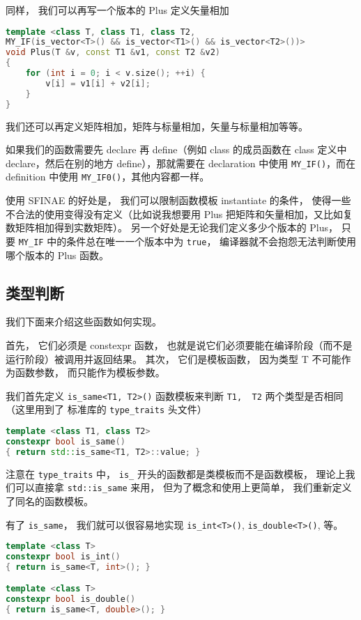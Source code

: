 同样， 我们可以再写一个版本的 Plus 定义矢量相加
\begin{lstlisting}[language=cpp]
template <class T, class T1, class T2,
MY_IF(is_vector<T>() && is_vector<T1>() && is_vector<T2>())>
void Plus(T &v, const T1 &v1, const T2 &v2)
{
    for (int i = 0; i < v.size(); ++i) {
        v[i] = v1[i] + v2[i];
    }
}
\end{lstlisting}

我们还可以再定义矩阵相加，矩阵与标量相加，矢量与标量相加等等。

如果我们的函数需要先 declare 再 define（例如 class 的成员函数在 class 定义中 declare，然后在别的地方 define），那就需要在 declaration 中使用 \verb|MY_IF()|，而在 definition 中使用 \verb|MY_IF0()|，其他内容都一样。

使用 SFINAE 的好处是， 我们可以限制函数模板 instantiate 的条件， 使得一些不合法的使用变得没有定义（比如说我想要用 Plus 把矩阵和矢量相加，又比如复数矩阵相加得到实数矩阵）。 另一个好处是无论我们定义多少个版本的 Plus， 只要 \verb|MY_IF| 中的条件总在唯一一个版本中为 \verb|true|， 编译器就不会抱怨无法判断使用哪个版本的 Plus 函数。

\subsection{类型判断}
我们下面来介绍这些函数如何实现。

首先， 它们必须是 constexpr 函数， 也就是说它们必须要能在编译阶段（而不是运行阶段）被调用并返回结果。 其次， 它们是模板函数， 因为类型 T 不可能作为函数参数， 而只能作为模板参数。

我们首先定义 \verb|is_same<T1, T2>()| 函数模板来判断 \verb|T1,  T2| 两个类型是否相同（这里用到了 标准库的 \verb|type_traits| 头文件）
\begin{lstlisting}[language=cpp]
template <class T1, class T2>
constexpr bool is_same()
{ return std::is_same<T1, T2>::value; }
\end{lstlisting}

注意在 \verb|type_traits| 中， \verb|is_| 开头的函数都是类模板而不是函数模板， 理论上我们可以直接拿 \verb|std::is_same| 来用， 但为了概念和使用上更简单， 我们重新定义了同名的函数模板。

有了 \verb|is_same|， 我们就可以很容易地实现 \verb|is_int<T>()|, \verb|is_double<T>()|, 等。
\begin{lstlisting}[language=cpp]
template <class T>
constexpr bool is_int()
{ return is_same<T, int>(); }

template <class T>
constexpr bool is_double()
{ return is_same<T, double>(); }
\end{lstlisting}

